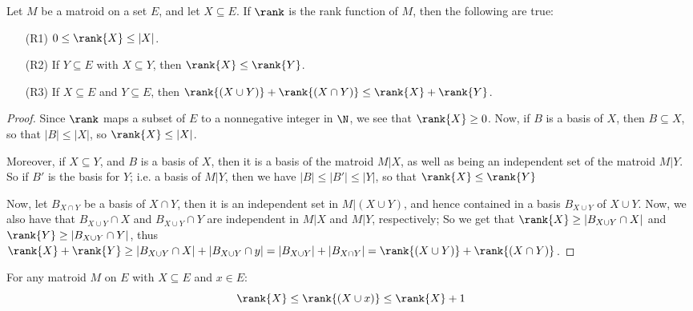 \begin{lemma}\label{1.3.1}
    Let $M$ be a matroid on a set  $E$, and let $X \subseteq E$. If $\rank$ is
    the rank function of  $M$, then the following are true:
    \begin{enumerate}
        \item[(R1)] $0 \leq \rank{X} \leq |X|$.

        \item[(R2)] If  $Y \subseteq E$ with  $X \subseteq Y$, then  $\rank{X}
            \leq \rank{Y}$.

        \item[(R3)] If $X \subseteq E$ and  $Y \subseteq E$, then $\rank{(X \cup
            Y)}+\rank{(X \cap Y)} \leq \rank{X}+\rank{Y}$.
    \end{enumerate}
\end{lemma}
\begin{proof}
    Since $\rank$ maps a subset of $E$ to a nonnegative integer in $\N$, we see
    that  $\rank{X} \geq 0$. Now, if $B$ is a basis of $X$, then  $B \subseteq
    X$, so that  $|B| \leq |X|$, so  $\rank{X} \leq |X|$.

    Moreover, if $X \subseteq Y$, and  $B$ is a basis
    of  $X$, then it is a basis of the matroid  $M|X$, as well as being an
    independent set of the matroid $M|Y$. So if  $B'$ is the basis for  $Y$;
    i.e. a basis of  $M|Y$, then we have  $|B| \leq |B'| \leq |Y|$, so that
    $\rank{X} \leq \rank{Y}$

    Now, let $B_{X \cap Y}$ be a basis of $X \cap Y$, then it is an independent
    set in  $M|(X \cup Y)$, and hence contained in a basis $B_{X \cup Y}$ of $X
    \cup Y$. Now, we also have that  $B_{X \cup Y} \cap X$ and $B_{X \cup Y}
    \cap Y$ are independent in  $M|X$ and  $M|Y$, respectively; So we get that
    $\rank{X} \geq |B_{X \cup Y} \cap X|$ and $\rank{Y} \geq |B_{X \cup Y} \cap
    Y|$, thus $\rank{X}+\rank{Y} \geq |B_{X \cup Y} \cap X|+|B_{X \cup Y} \cap
    y|=|B_{X \cup Y}|+|B_{X \cap Y}|=\rank{(X \cup Y)}+\rank{(X \cap Y)}$.
\end{proof}
\begin{corollary}
    For any matroid $M$ on  $E$ with $X \subseteq E$ and  $x \in E$:
    \begin{equation*}
        \rank{X} \leq \rank{(X \cup x)} \leq \rank{X}+1
    \end{equation*}
\end{corollary}

